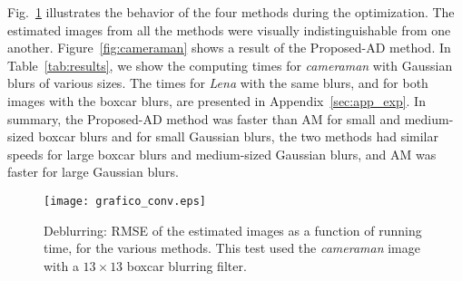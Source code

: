 \documentclass[10pt,twocolumn,twoside]{IEEEtran}
\begin{document}

Fig.~\ref{fig:grafico_conv} illustrates the behavior of the four methods during the optimization. The estimated images from all the methods were visually indistinguishable from one another. Figure~\ref{fig:cameraman} shows a result of the Proposed-AD method. In Table~\ref{tab:results}, we show the computing times for \emph{cameraman} with Gaussian blurs of various sizes. The times for \textit{Lena} with the same blurs, and for both images with the boxcar blurs, are presented in Appendix~\ref{sec:app_exp}. In summary, the Proposed-AD method was faster than AM for small and medium-sized boxcar blurs and for small Gaussian blurs, the two methods had similar speeds for large boxcar blurs and medium-sized Gaussian blurs, and AM was faster for large Gaussian blurs.



\begin{figure}[!t]
	\centering
	\vspace{-6pt}
	\texttt{[image: grafico\_conv.eps]}%
	\vspace{-6pt}
	\caption{Deblurring: RMSE of the estimated images as a function of running time, for the various methods. This test used the \textit{cameraman} image with a $13 \times 13$ boxcar blurring filter.}	
	\label{fig:grafico_conv}
\end{figure}
\end{document}
